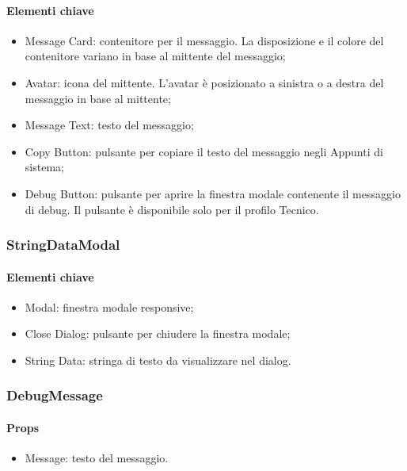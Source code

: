 \paragraph*{Elementi chiave}
\begin{itemize}
  \item Message Card: contenitore per il messaggio. La disposizione e il colore del contenitore variano in base al mittente del messaggio;
  \item Avatar: icona del mittente. L'avatar è posizionato a sinistra o a destra del messaggio in base al mittente;
  \item Message Text: testo del messaggio;
  \item Copy Button: pulsante per copiare il testo del messaggio negli Appunti di sistema;
  \item Debug Button: pulsante per aprire la finestra modale contenente il messaggio di debug. Il pulsante è disponibile solo per il profilo Tecnico.
\end{itemize}

\subsubsection{StringDataModal}

\paragraph*{Elementi chiave}
\begin{itemize}
  \item Modal: finestra modale responsive;
  \item Close Dialog: pulsante per chiudere la finestra modale;
  \item String Data: stringa di testo da visualizzare nel dialog.
\end{itemize}

\subsubsection{DebugMessage}

\paragraph*{Props}
\begin{itemize}
  \item Message: testo del messaggio.
\end{itemize}

